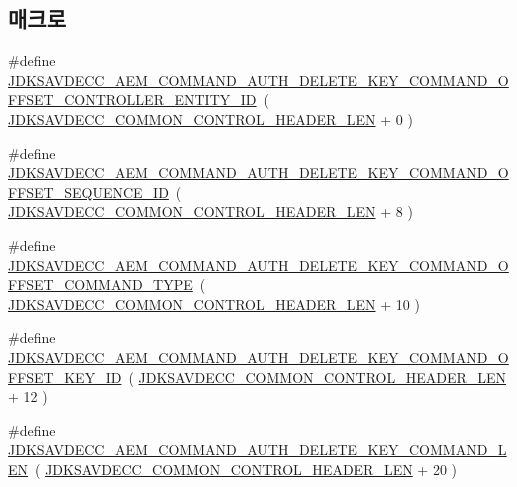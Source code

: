 \subsection*{매크로}
\begin{DoxyCompactItemize}
\item 
\#define \hyperlink{group__command__auth__delete__key_gab029f0b5f3665cdd6b463bb3f0b87b59}{J\+D\+K\+S\+A\+V\+D\+E\+C\+C\+\_\+\+A\+E\+M\+\_\+\+C\+O\+M\+M\+A\+N\+D\+\_\+\+A\+U\+T\+H\+\_\+\+D\+E\+L\+E\+T\+E\+\_\+\+K\+E\+Y\+\_\+\+C\+O\+M\+M\+A\+N\+D\+\_\+\+O\+F\+F\+S\+E\+T\+\_\+\+C\+O\+N\+T\+R\+O\+L\+L\+E\+R\+\_\+\+E\+N\+T\+I\+T\+Y\+\_\+\+ID}~( \hyperlink{group__jdksavdecc__avtp__common__control__header_gaae84052886fb1bb42f3bc5f85b741dff}{J\+D\+K\+S\+A\+V\+D\+E\+C\+C\+\_\+\+C\+O\+M\+M\+O\+N\+\_\+\+C\+O\+N\+T\+R\+O\+L\+\_\+\+H\+E\+A\+D\+E\+R\+\_\+\+L\+EN} + 0 )
\item 
\#define \hyperlink{group__command__auth__delete__key_ga9004950600f6c745059acfe7166868d5}{J\+D\+K\+S\+A\+V\+D\+E\+C\+C\+\_\+\+A\+E\+M\+\_\+\+C\+O\+M\+M\+A\+N\+D\+\_\+\+A\+U\+T\+H\+\_\+\+D\+E\+L\+E\+T\+E\+\_\+\+K\+E\+Y\+\_\+\+C\+O\+M\+M\+A\+N\+D\+\_\+\+O\+F\+F\+S\+E\+T\+\_\+\+S\+E\+Q\+U\+E\+N\+C\+E\+\_\+\+ID}~( \hyperlink{group__jdksavdecc__avtp__common__control__header_gaae84052886fb1bb42f3bc5f85b741dff}{J\+D\+K\+S\+A\+V\+D\+E\+C\+C\+\_\+\+C\+O\+M\+M\+O\+N\+\_\+\+C\+O\+N\+T\+R\+O\+L\+\_\+\+H\+E\+A\+D\+E\+R\+\_\+\+L\+EN} + 8 )
\item 
\#define \hyperlink{group__command__auth__delete__key_gacad24c32051ddc6b8d30d3888a300453}{J\+D\+K\+S\+A\+V\+D\+E\+C\+C\+\_\+\+A\+E\+M\+\_\+\+C\+O\+M\+M\+A\+N\+D\+\_\+\+A\+U\+T\+H\+\_\+\+D\+E\+L\+E\+T\+E\+\_\+\+K\+E\+Y\+\_\+\+C\+O\+M\+M\+A\+N\+D\+\_\+\+O\+F\+F\+S\+E\+T\+\_\+\+C\+O\+M\+M\+A\+N\+D\+\_\+\+T\+Y\+PE}~( \hyperlink{group__jdksavdecc__avtp__common__control__header_gaae84052886fb1bb42f3bc5f85b741dff}{J\+D\+K\+S\+A\+V\+D\+E\+C\+C\+\_\+\+C\+O\+M\+M\+O\+N\+\_\+\+C\+O\+N\+T\+R\+O\+L\+\_\+\+H\+E\+A\+D\+E\+R\+\_\+\+L\+EN} + 10 )
\item 
\#define \hyperlink{group__command__auth__delete__key_ga5382aaa8b985c51d5c11cd66cb482212}{J\+D\+K\+S\+A\+V\+D\+E\+C\+C\+\_\+\+A\+E\+M\+\_\+\+C\+O\+M\+M\+A\+N\+D\+\_\+\+A\+U\+T\+H\+\_\+\+D\+E\+L\+E\+T\+E\+\_\+\+K\+E\+Y\+\_\+\+C\+O\+M\+M\+A\+N\+D\+\_\+\+O\+F\+F\+S\+E\+T\+\_\+\+K\+E\+Y\+\_\+\+ID}~( \hyperlink{group__jdksavdecc__avtp__common__control__header_gaae84052886fb1bb42f3bc5f85b741dff}{J\+D\+K\+S\+A\+V\+D\+E\+C\+C\+\_\+\+C\+O\+M\+M\+O\+N\+\_\+\+C\+O\+N\+T\+R\+O\+L\+\_\+\+H\+E\+A\+D\+E\+R\+\_\+\+L\+EN} + 12 )
\item 
\#define \hyperlink{group__command__auth__delete__key_gac6d4d2fa0239845c45512103ef2efa1c}{J\+D\+K\+S\+A\+V\+D\+E\+C\+C\+\_\+\+A\+E\+M\+\_\+\+C\+O\+M\+M\+A\+N\+D\+\_\+\+A\+U\+T\+H\+\_\+\+D\+E\+L\+E\+T\+E\+\_\+\+K\+E\+Y\+\_\+\+C\+O\+M\+M\+A\+N\+D\+\_\+\+L\+EN}~( \hyperlink{group__jdksavdecc__avtp__common__control__header_gaae84052886fb1bb42f3bc5f85b741dff}{J\+D\+K\+S\+A\+V\+D\+E\+C\+C\+\_\+\+C\+O\+M\+M\+O\+N\+\_\+\+C\+O\+N\+T\+R\+O\+L\+\_\+\+H\+E\+A\+D\+E\+R\+\_\+\+L\+EN} + 20 )
\end{DoxyCompactItemize}
